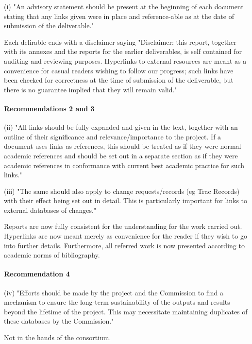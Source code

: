 \documentclass{deliverablereport}
\begin{document}
(i) "An advisory statement should be present at the beginning of each document stating that any links given were in 
place and reference-able as at the date of submission of the deliverable."

Each delirable ends with a disclaimer saying "Disclaimer: this report, together with its annexes and the reports for the earlier deliverables,
is self contained for auditing and reviewing purposes. Hyperlinks to external resources are
meant as a convenience for casual readers wishing to follow our progress; such links have
been checked for correctness at the time of submission of the deliverable, but there is no
guarantee implied that they will remain valid."


\paragraph{Recommendations 2 and 3}

(ii) "All links should be fully expanded and given in the text, together with an outline of their significance and 
relevance/importance to the project. If a document uses links as references, this should be treated as if they were 
normal academic references and should be set out in a separate section as if they were academic references in 
conformance with current best academic practice for such links."

(iii) "The same should also apply to change requests/records (eg Trac Records) with their effect being set out in detail. 
This is particularly important for links to external databases of changes."

Reports are now fully consistent for the understanding for the work carried out. Hyperlinks are now meant merely
as convenience for the reader if they wish to go into further details. Furthermore, all referred work is now presented according
to academic norms of bibliography.

\paragraph{Recommendation 4}
(iv) "Efforts should be made by the project and the Commission to find a mechanism to ensure the long-term 
sustainability of the outputs and results beyond the lifetime of the project. This may necessitate maintaining 
duplicates of these databases by the Commission."

Not in the hands of the consortium.

\end{document}
